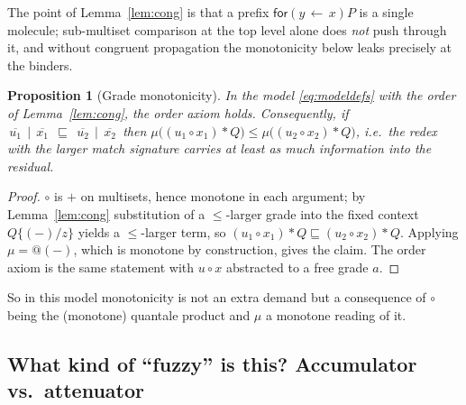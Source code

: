 \documentclass[11pt]{article}
\makeatletter
\theoremstyle{plain}
\newtheorem{proposition}{Proposition}
\theoremstyle{definition}
\theoremstyle{remark}
\newcommand{\for}[2]{\mathsf{for}(#1 \,{\leftarrow}\, #2)}
\newcommand{\quo}[1]{@#1}
\newcommand{\dr}[1]{\,\overline{#1}\,}   %
\newcommand{\act}{\mathbin{*}}
\newcommand{\cmp}{\mathbin{\circ}}       %
\newcommand{\meas}{\mu}
\makeatother
\begin{document}
\noindent The point of Lemma~\ref{lem:cong} is that a prefix $\for{y}{x}P$ is a single molecule;
sub-multiset comparison at the top level alone does \emph{not} push through it, and without
congruent propagation the monotonicity below leaks precisely at the binders.

\begin{proposition}[Grade monotonicity]\label{prop:mono}
In the model \eqref{eq:modeldefs} with the order of Lemma~\ref{lem:cong}, the order axiom holds.
Consequently, if $\dr{u_1}\mid \dr{x_1}\;\sqsubseteq\;\dr{u_2}\mid \dr{x_2}$ then
$\meas\big((u_1\cmp x_1)\act Q\big)\le \meas\big((u_2\cmp x_2)\act Q\big)$, i.e.\ the redex with the
larger match signature carries at least as much information into the residual.
\end{proposition}

\begin{proof}
$\cmp$ is $+$ on multisets, hence monotone in each argument; by Lemma~\ref{lem:cong} substitution of
a $\le$-larger grade into the fixed context $Q\{(-)/z\}$ yields a $\le$-larger term, so
$(u_1\cmp x_1)\act Q \sqsubseteq (u_2\cmp x_2)\act Q$. Applying $\meas=\quo{(-)}$, which is monotone
by construction, gives the claim. The order axiom is the same statement with $u\cmp x$ abstracted to
a free grade $a$.
\end{proof}

So in this model monotonicity is not an extra demand but a consequence of $\cmp$ being the (monotone)
quantale product and $\meas$ a monotone reading of it.

\subsection{What kind of ``fuzzy'' is this? Accumulator vs.\ attenuator}
\end{document}
